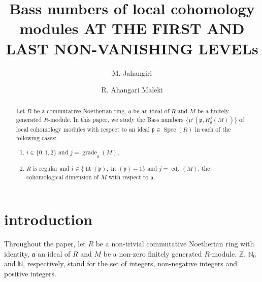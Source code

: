 \documentclass[12pt,twoside, final]{amsart}
\numberwithin{equation}{section}
\newtheorem{nota rem}[thm]{Notation and Remark}
\newtheorem{defen rem}[thm]{Definition and Remark}
\def\hei{\operatorname{ht}}
\def\Spec{\operatorname{Spec}}
\def\grade{\operatorname{grade}}
\def\cd{\operatorname{cd}}
\newcommand{\p}{\mathfrak{p}}
\newcommand{\fa}{\mathfrak{a}}
\newcommand{\Z}{\mathbb{Z}}
\newcommand{\NN}{\mathbb{N}}
\begin{document}



\author{M. Jahangiri}
\address{ Department of Mathematics, Faculty of Mathematical Sciences and Computer, Kharazmi University, Tehran,
Iran.}

 \author{R. Ahangari Maleki}
 

\title[  Bass numbers of local cohomology modules ...]
{  Bass numbers of   local cohomology modules AT THE FIRST AND LAST NON-VANISHING LEVELs}

\begin{abstract}
Let $R $ be a commutative Noetherian ring, $\fa$ be an ideal of $R$   and $M$  be a finitely generated    $R$-module.  In this paper, we study the Bass numbers  
$\{\mu^i(\p, H^j_{\fa}(M))\} $   of local cohomology modules with respect to an ideal $\p\in \Spec(R)$ in each of the following cases:
\begin{enumerate}
    \item $i\in \{ 0, 1, 2\}$ and $j= \grade_{\fa}(M),$ 
  \item  $R$ is regular and $i\in\{ \hei(\p),  \hei(\p)- 1\}$ and $j= \cd_{\fa}(M)$, the cohomological dimension of $M$ with respect to $\fa$.
  \end{enumerate}
  
\end{abstract}
\maketitle

\section{introduction}

Throughout the paper, let $R$ be a non-trivial commutative Noetherian ring with identity, $\fa$   an ideal of $R$ and $M$ be a non-zero finitely generated $R$-module.     $\Z$, $\NN_0$ and $\NN $, respectively, stand for the set of   integers, non-negative integers and positive integers.
\end{document}
